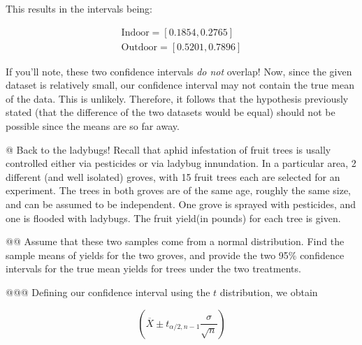 \documentclass[10pt]{article}\usepackage[]{graphicx}\usepackage[]{xcolor}
\begin{document}
\begin{easylist}[enumerate]
    This results in the intervals being:

    \[
        \begin{aligned}
            \text{Indoor} = \left[ 0.1854, 0.2765 \right]\\
            \text{Outdoor} = \left[ 0.5201, 0.7896 \right]
        \end{aligned}
    \]

    If you'll note, these two confidence intervals \textit{do not} overlap! Now, since the given dataset is relatively
    small, our confidence interval may not contain the true mean of the data. This is unlikely. Therefore, it follows
    that the hypothesis previously stated (that the difference of the two datasets would be equal) should not be
    possible since the means are so far away.


    @ Back to the ladybugs! Recall that aphid infestation of fruit trees is usally controlled either via pesticides or
    via ladybug innundation. In a particular area, 2 different (and well isolated) groves, with 15 fruit trees each are
    selected for an experiment. The trees in both groves are of the same age, roughly the same size, and can be assumed
    to be independent. One grove is sprayed with pesticides, and one is flooded with ladybugs. The fruit yield(in
    pounds) for each tree is given.

    @@ Assume that these two samples come from a normal distribution. Find the sample means of yields for the two
    groves, and provide the two 95\% confidence intervals for the true mean yields for trees under the two treatments.

    @@@ Defining our confidence interval using the $t$ distribution, we obtain

    \[
        \left( \overline{X} \pm t_{\alpha / 2, n - 1} \frac{\sigma}{\sqrt{n} } \right)
    \]


\end{easylist}
\end{document}
